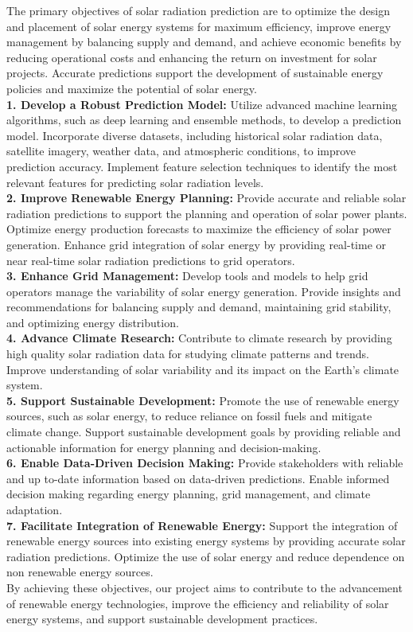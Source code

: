 \documentclass[12pt,a4paper]{report}
\begin{document}
The primary objectives of solar radiation prediction are to optimize the design and placement of solar energy systems for maximum efficiency, improve energy management by balancing supply and demand, and achieve economic benefits by reducing operational costs and enhancing the return on investment for solar projects. Accurate predictions support the development of sustainable energy policies and maximize the potential of solar energy.\\
\textbf{1. Develop a Robust Prediction Model:} Utilize advanced machine learning 
algorithms, such as deep learning and ensemble methods, to develop a prediction 
model. Incorporate diverse datasets, including historical solar radiation data, satellite 
imagery, weather data, and atmospheric conditions, to improve prediction accuracy. 
Implement feature selection techniques to identify the most relevant features for 
predicting solar radiation levels. \\
\textbf{2. Improve Renewable Energy Planning:} Provide accurate and reliable solar 
radiation predictions to support the planning and operation of solar power plants. 
Optimize energy production forecasts to maximize the efficiency of solar power 
generation. Enhance grid integration of solar energy by providing real-time or near
real-time solar radiation predictions to grid operators.\\ 
\textbf{3. Enhance Grid Management:} Develop tools and models to help grid operators 
manage the variability of solar energy generation. Provide insights and 
recommendations for balancing supply and demand, maintaining grid stability, and 
optimizing energy distribution. \\
\textbf{4. Advance Climate Research:} Contribute to climate research by providing high
quality solar radiation data for studying climate patterns and trends. Improve 
understanding of solar variability and its impact on the Earth's climate system.\\ 
\textbf{5. Support Sustainable Development:} Promote the use of renewable energy sources, 
such as solar energy, to reduce reliance on fossil fuels and mitigate climate change. 
Support sustainable development goals by providing reliable and actionable 
information for energy planning and decision-making.\\ 
\textbf{6. Enable Data-Driven Decision Making:} Provide stakeholders with reliable and up
to-date information based on data-driven predictions. Enable informed decision
making regarding energy planning, grid management, and climate adaptation. \\
\textbf{7. Facilitate Integration of Renewable Energy:} Support the integration of renewable 
energy sources into existing energy systems by providing accurate solar radiation 
predictions. Optimize the use of solar energy and reduce dependence on non
renewable energy sources. \\
By achieving these objectives, our project aims to contribute to the advancement of 
renewable energy technologies, improve the efficiency and reliability of solar energy 
systems, and support sustainable development practices.
\end{document}
